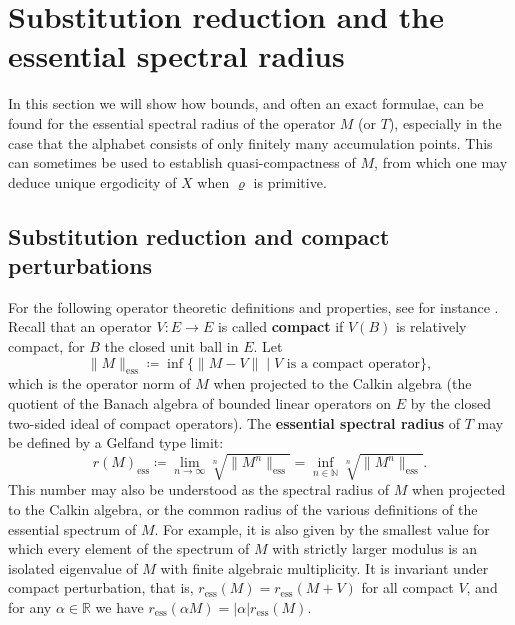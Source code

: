 \documentclass[11pt]{amsart}
\numberwithin{equation}{section}
\theoremstyle{plain}
\theoremstyle{definition}
\newcommand{\R}{{\mathbb R}}
\newcommand{\N}{{\mathbb N}}
\newcommand{\sub}{\varrho}
\begin{document}
\section{Substitution reduction and the essential spectral radius}\label{sec:sub reduction}

In this section we will show how bounds, and often an exact formulae, can be found for the essential spectral radius of the operator \(M\) (or \(T\)), especially in the case that the alphabet consists of only finitely many accumulation points. This can sometimes be used to establish quasi-compactness of \(M\), from which one may deduce unique ergodicity of \(X\) when \(\sub\) is primitive.

\subsection{Substitution reduction and compact perturbations}
For the following operator theoretic definitions and properties, see for instance \cite{Arv02,Bro61}. Recall that an operator \(V \colon E \to E\) is called \textbf{compact} if \(V(B)\) is relatively compact, for \(B\) the closed unit ball in \(E\). Let
\[
\|M\|_\mathrm{ess} \coloneqq \inf\{ \|M - V\| \mid V \text{ is a compact operator} \} ,
\]
which is the operator norm of \(M\) when projected to the Calkin algebra (the quotient of the Banach algebra of bounded linear operators on \(E\) by the closed two-sided ideal of compact operators). The \textbf{essential spectral radius} of \(T\) may be defined by a Gelfand type limit:
\begin{equation}\label{eq:essential Gelfand}
r(M)_\mathrm{ess} \coloneqq \lim_{n \to \infty} \sqrt[n]{ \|M^n\|_\mathrm{ess} } = \inf_{n \in \N} \sqrt[n]{ \|M^n\|_\mathrm{ess} } .
\end{equation}
This number may also be understood as the spectral radius of \(M\) when projected to the Calkin algebra, or the common radius of the various definitions of the essential spectrum of \(M\). For example, it is also given by the smallest value for which every element of the spectrum of \(M\) with strictly larger modulus is an isolated eigenvalue of \(M\) with finite algebraic multiplicity. It is invariant under compact perturbation, that is, \(r_\mathrm{ess}(M) = r_\mathrm{ess}(M+V)\) for all compact \(V\), and for any \(\alpha \in \R\) we have \(r_\mathrm{ess}(\alpha M) = |\alpha| r_\mathrm{ess}(M)\).
\end{document}

